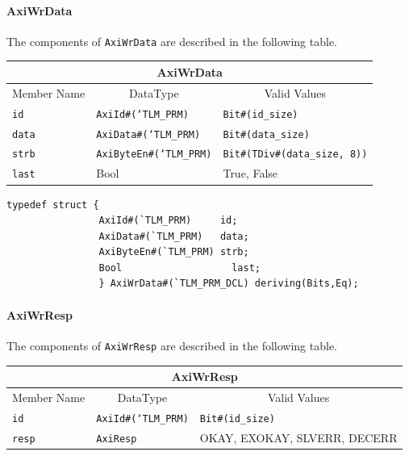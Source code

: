 \documentclass[twoside,letterpaper]{article}
\newcommand{\te}[1]{\texttt{#1}}
\begin{document}
\paragraph{\bf AxiWrData} The components of \te{AxiWrData} are described in the following table.

\begin{center}
\begin{tabular}{|p{1 in}|p{1.8in}|p{3.2in}|}
\hline
\multicolumn{3}{|c|}{AxiWrData} \\
\hline
\multicolumn{1}{|c|}{Member Name}&\multicolumn{1}{|c|}{DataType}&\multicolumn{1}{|c|}{Valid Values} \\
\hline
\hline
\te{id}&\te{AxiId\#(`TLM\_PRM)}&\te{Bit\#(id\_size)}\\
\hline
\te{data}&\te{AxiData\#(`TLM\_PRM)}&\te{Bit\#(data\_size)}\\
\hline
\te{strb}&\te{AxiByteEn\#(`TLM\_PRM)}&\te{Bit\#(TDiv\#(data\_size, 8))}\\
\hline
\te{last}&Bool&True, False\\
\hline
\end{tabular}
\end{center}

\begin{verbatim}
typedef struct {
                AxiId#(`TLM_PRM)     id;
                AxiData#(`TLM_PRM)   data;
                AxiByteEn#(`TLM_PRM) strb;
                Bool                   last;
                } AxiWrData#(`TLM_PRM_DCL) deriving(Bits,Eq);
\end{verbatim}


\paragraph{\bf AxiWrResp} The components of \te{AxiWrResp}  are described in the following table.




\begin{center}
\begin{tabular}{|p{1 in}|p{1.8in}|p{3.2in}|}
\hline
\multicolumn{3}{|c|}{AxiWrResp} \\
\hline
\multicolumn{1}{|c|}{Member Name}&\multicolumn{1}{|c|}{DataType}&\multicolumn{1}{|c|}{Valid Values} \\
\hline
\hline
\te{id}&\te{AxiId\#(`TLM\_PRM)}&\te{Bit\#(id\_size)}\\
\hline
\te{resp}&\te{AxiResp}&OKAY, EXOKAY, SLVERR, DECERR\\
\hline
\end{tabular}
\end{center}
\end{document}

